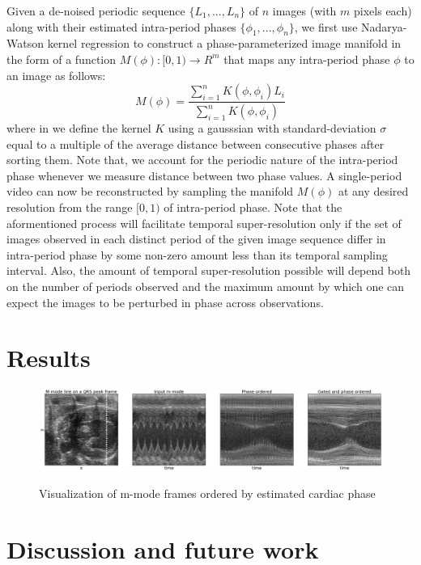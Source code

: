 \documentclass[runningheads,a4paper]{llncs}
\newcounter{lfigcounter}
\newenvironment{IonFigT}{\setcounter{lfigcounter}{1}\begin{figure}[!t]}{\end{figure}}
\def\ionbox#1{\makebox[#1]{(\alph{lfigcounter})}\stepcounter{lfigcounter}}
\begin{document}
Given a de-noised periodic sequence $\{L_1, ..., L_n\}$ of $n$ images (with $m$ pixels each) along with their estimated intra-period phases $\{\phi_1, ..., \phi_n\}$, we first use Nadarya-Watson kernel regression\cite{Bishop2006} to construct a phase-parameterized image manifold in the form of a function $M(\phi): [0, 1) \to R^m $ that maps any intra-period phase $\phi$ to an image as follows:
\begin{equation}
M(\phi) = \frac{\sum_{i = 1}^{n} K(\phi, \phi_i) L_i}{\sum_{i = 1}^{n} K(\phi, \phi_i)} 
\end{equation}
where in we define the kernel $K$ using a gausssian with standard-deviation $\sigma$ equal to a multiple of the average distance between consecutive phases after sorting them. Note that, we account for the periodic nature of the intra-period phase whenever we measure distance between two phase values. A single-period video can now be reconstructed by sampling the manifold $M(\phi)$ at any desired resolution from the range $[0, 1)$ of intra-period phase. Note that the aformentioned process will facilitate temporal super-resolution only if the set of images observed in each distinct period of the given image sequence differ in intra-period phase by some non-zero amount less than its temporal sampling interval. Also, the amount of temporal super-resolution possible will depend both on the number of periods observed and the maximum amount by which one can expect the images to be perturbed in phase across observations. 
\section{Results}
\label{sec:results}
%
%
\begin{IonFigT}
\centering
%
\includegraphics[width=5.0in]{figures/decoded/2015-07-27-10-36-06_2015-07-15-16-56-16_1.raw.bmode/phaseordered.png}
\ionbox{5.0in}\\
%
\caption{Visualization of m-mode frames ordered by estimated cardiac phase}
\label{fig:phase_ordering}
\end{IonFigT}
%
%
\section{Discussion and future work}
\label{sec:discussion}
%


%


\end{document}
